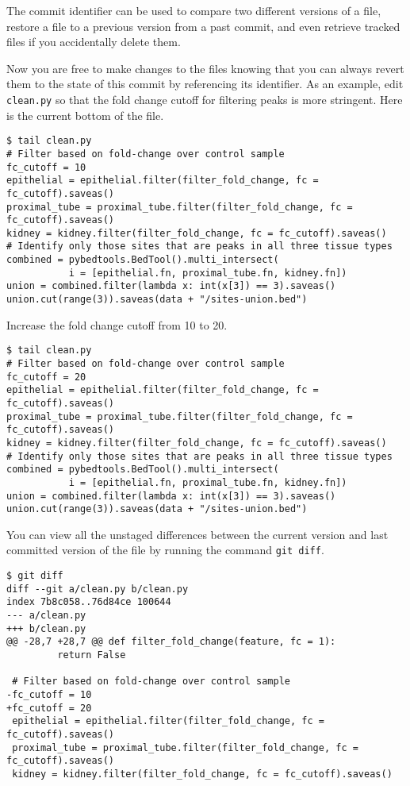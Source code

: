 The commit identifier can be used to compare two different versions of a file, restore a file to a previous version from a past commit, and even retrieve tracked files if you accidentally delete them.

Now you are free to make changes to the files knowing that you can always revert them to the state of this commit by referencing its identifier.
As an example, edit \verb|clean.py| so that the fold change cutoff for filtering peaks is more stringent.
Here is the current bottom of the file.

\begin{verbatim}
$ tail clean.py
# Filter based on fold-change over control sample
fc_cutoff = 10
epithelial = epithelial.filter(filter_fold_change, fc = fc_cutoff).saveas()
proximal_tube = proximal_tube.filter(filter_fold_change, fc = fc_cutoff).saveas()
kidney = kidney.filter(filter_fold_change, fc = fc_cutoff).saveas()
# Identify only those sites that are peaks in all three tissue types
combined = pybedtools.BedTool().multi_intersect(
           i = [epithelial.fn, proximal_tube.fn, kidney.fn])
union = combined.filter(lambda x: int(x[3]) == 3).saveas()
union.cut(range(3)).saveas(data + "/sites-union.bed")
\end{verbatim}

Increase the fold change cutoff from 10 to 20.

\begin{verbatim}
$ tail clean.py
# Filter based on fold-change over control sample
fc_cutoff = 20
epithelial = epithelial.filter(filter_fold_change, fc = fc_cutoff).saveas()
proximal_tube = proximal_tube.filter(filter_fold_change, fc = fc_cutoff).saveas()
kidney = kidney.filter(filter_fold_change, fc = fc_cutoff).saveas()
# Identify only those sites that are peaks in all three tissue types
combined = pybedtools.BedTool().multi_intersect(
           i = [epithelial.fn, proximal_tube.fn, kidney.fn])
union = combined.filter(lambda x: int(x[3]) == 3).saveas()
union.cut(range(3)).saveas(data + "/sites-union.bed")
\end{verbatim}

You can view all the unstaged differences between the current version and last committed version of the file by running the command \verb|git diff|.

\begin{verbatim}
$ git diff
diff --git a/clean.py b/clean.py
index 7b8c058..76d84ce 100644
--- a/clean.py
+++ b/clean.py
@@ -28,7 +28,7 @@ def filter_fold_change(feature, fc = 1):
         return False

 # Filter based on fold-change over control sample
-fc_cutoff = 10
+fc_cutoff = 20
 epithelial = epithelial.filter(filter_fold_change, fc = fc_cutoff).saveas()
 proximal_tube = proximal_tube.filter(filter_fold_change, fc = fc_cutoff).saveas()
 kidney = kidney.filter(filter_fold_change, fc = fc_cutoff).saveas()
\end{verbatim}

